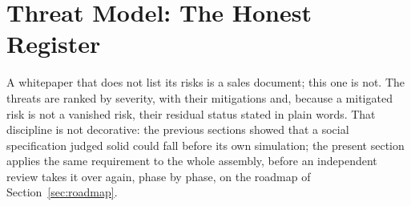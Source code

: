 
\section{Threat Model: The Honest Register}\label{sec:threats}

A whitepaper that does not list its risks is a sales document; this one
is not. The threats are ranked by severity, with their mitigations and,
because a mitigated risk is not a vanished risk, their residual status
stated in plain words. That discipline is not decorative: the previous
sections showed that a social specification judged solid could fall
before its own simulation; the present section applies the same
requirement to the whole assembly, before an independent review takes it
over again, phase by phase, on the roadmap of Section~\ref{sec:roadmap}.

